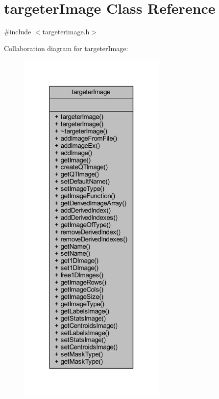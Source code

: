 \hypertarget{classtargeter_image}{}\section{targeter\+Image Class Reference}
\label{classtargeter_image}


{\ttfamily \#include $<$targeterimage.\+h$>$}



Collaboration diagram for targeter\+Image\+:
\nopagebreak
\begin{figure}[H]
\begin{center}
\leavevmode
\includegraphics[width=208pt]{classtargeter_image__coll__graph}
\end{center}
\end{figure}

